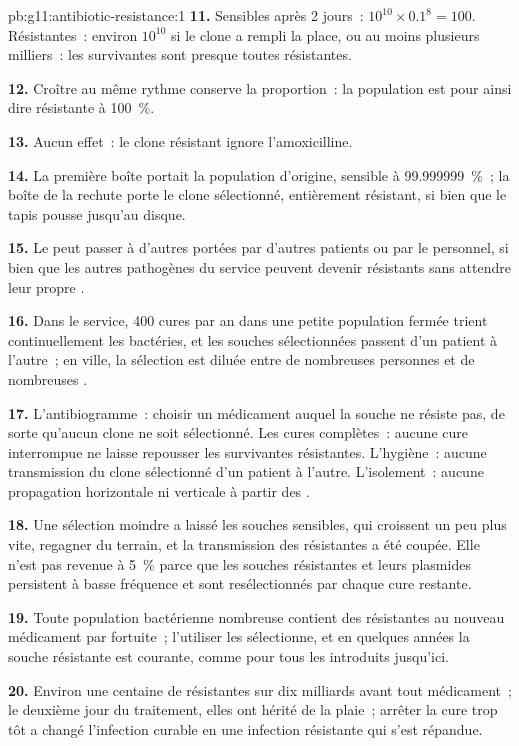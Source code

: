 \begin{solution}{pb:g11:antibiotic-resistance:1}
\textbf{11.} Sensibles après 2 jours~: $10^{10} \times 0.1^8 = 100$.
Résistantes~: environ $10^{10}$ si le clone a rempli la place, ou au
moins plusieurs milliers~: les survivantes sont presque toutes
résistantes.

\textbf{12.} Croître au même rythme conserve la proportion~: la
population est pour ainsi dire résistante à 100~\%.

\textbf{13.} Aucun effet~: le clone résistant ignore l'amoxicilline.

\textbf{14.} La première boîte portait la population d'origine,
sensible à 99.999999~\%~; la boîte de la rechute porte le clone
sélectionné, entièrement résistant, si bien que le tapis pousse
jusqu'au disque.

\textbf{15.} Le  peut passer à d'autres  portées par
d'autres patients ou par le personnel, si bien que les autres
pathogènes du service peuvent devenir résistants sans attendre leur
propre .

\textbf{16.} Dans le service, 400 cures par an dans une petite
population fermée trient continuellement les bactéries, et les souches
sélectionnées passent d'un patient à l'autre~; en ville, la sélection
est diluée entre de nombreuses personnes et de nombreuses .

\textbf{17.} L'antibiogramme~: choisir un médicament auquel la souche
ne résiste pas, de sorte qu'aucun clone ne soit sélectionné. Les cures
complètes~: aucune cure interrompue ne laisse repousser les
survivantes résistantes. L'hygiène~: aucune transmission du clone
sélectionné d'un patient à l'autre. L'isolement~: aucune propagation
horizontale ni verticale à partir des .

\textbf{18.} Une sélection moindre a laissé les souches sensibles, qui
croissent un peu plus vite, regagner du terrain, et la transmission des
résistantes a été coupée. Elle n'est pas revenue à 5~\% parce que les
souches résistantes et leurs plasmides persistent à basse fréquence et
sont resélectionnés par chaque cure restante.

\textbf{19.} Toute population bactérienne nombreuse contient des
 résistantes au nouveau médicament par  fortuite~;
l'utiliser les sélectionne, et en quelques années la souche résistante
est courante, comme pour tous les  introduits jusqu'ici.

\textbf{20.} Environ une centaine de  résistantes sur dix
milliards avant tout médicament~; le deuxième jour du traitement, elles
ont hérité de la plaie~; arrêter la cure trop tôt a changé l'infection
curable en une infection résistante qui s'est répandue.
\end{solution}
